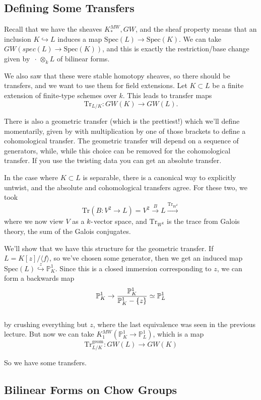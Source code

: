 \documentclass[11pt]{scrreprt}
\theoremstyle{definition}
\newcommand{\PP}[0]{{\mathbb{P}}}
\newcommand{\Tr}[0]{\mathrm{Tr}}
\newcommand{\spec}[0]{{\mathrm{Spec}}}
\newcommand{\mapsvia}[1]{\xrightarrow{#1}}
\newcommand{\generators}[1]{\langle{#1}\rangle}
\newcommand{\theset}[1]{\{{#1}\}}
\newcommand{\tensor}[0]{\otimes}
\newcommand{\wait}[0]{{\,\cdot\,}}
\newcommand{\dash}[0]{{\hbox{-}}}
\newcommand{\homotopic}[0]{\simeq}
\newcommand{\injects}[0]{\hookrightarrow}
\begin{document}
\hypertarget{defining-some-transfers}{%
\subsection{Defining Some Transfers}\label{defining-some-transfers}}

Recall that we have the sheaves \(K^{MW}_*, GW\), and the sheaf property
means that an inclusion \(K \injects L\) induces a map
\(\spec(L) \to \spec(K)\). We can take \(GW(spec(L) \to \spec(K))\), and
this is exactly the restriction/base change given by
\(\wait \tensor_k L\) of bilinear forms.

We also saw that these were stable homotopy sheaves, so there should be
transfers, and we want to use them for field extensions. Let
\(K\subset L\) be a finite extension of finite-type schemes over \(k\).
This leads to transfer maps \[
\Tr_{L/K}: GW(K) \to GW(L).
\]

There is also a geometric transfer (which is the prettiest!) which we'll
define momentarily, given by with multiplication by one of those
brackets to define a cohomological transfer. The geometric transfer will
depend on a sequence of generators, while, while this choice can be
removed for the cohomological transfer. If you use the twisting data you
can get an absolute transfer.

In the case where \(K\subset L\) is separable, there is a canonical way
to explicitly untwist, and the absolute and cohomological transfers
agree. For these two, we took \[
\Tr(B: V^2 \to L) = V^2 \mapsvia{B} L \mapsvia{\Tr_{W^k}}
\] where we now view \(V\) as a \(k\dash\)vector space, and
\(\Tr_{W^k}\) is the trace from Galois theory, the sum of the Galois
conjugates.

We'll show that we have this structure for the geometric transfer. If
\(L = K[z]/\generators{f}\), so we've chosen some generator, then we get
an induced map \(\spec(L) \overset{z}\injects \PP^1_K\). Since this is a
closed immersion corresponding to \(z\), we can form a backwards map \[
\PP^1_K \to {\PP^1_K \over \PP^1_K-\theset{z}} \homotopic \PP^1_L
\]\\
by crushing everything but \(z\), where the last equivalence was seen in
the previous lecture. But now we can take
\(K^{MW}_1(\PP^1_K \to \PP^1_L)\), which is a map \[
\Tr_{L/K}^{\text{geom}}:  GW(L) \to GW(K)
\]

So we have some transfers.

\hypertarget{bilinear-forms-on-chow-groups}{%
\subsection{Bilinear Forms on Chow
Groups}\label{bilinear-forms-on-chow-groups}}
\end{document}
